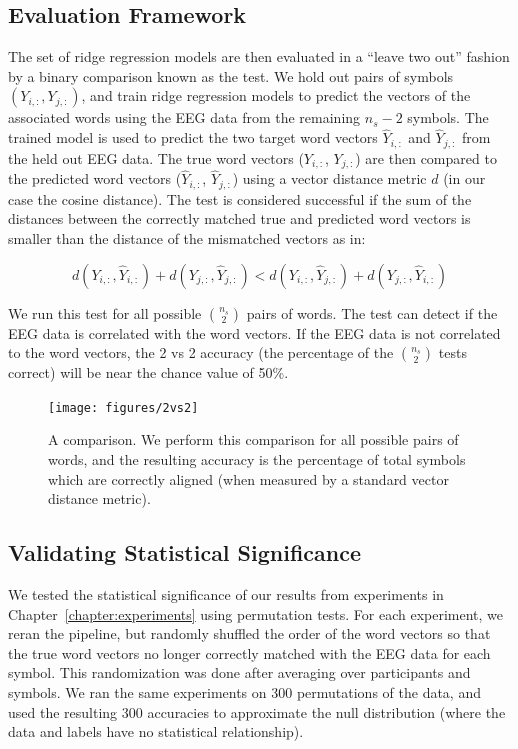 \subsection{Evaluation Framework}
The set of ridge regression models are then evaluated in a ``leave two out'' 
fashion by a binary comparison known as the \tvt test. We hold out pairs of 
symbols $(Y_{i,:}, Y_{j,:})$, and train ridge regression models to predict the 
vectors of the associated words using the EEG data from the remaining $n_s-2$ 
symbols.  The trained model is used to predict the two target word vectors 
$\hat{Y}_{i,:}$ and $\hat{Y}_{j,:}$ from the held out EEG data. The true word 
vectors ($Y_{i,:}$, $Y_{j,:}$) are then compared to the predicted word vectors 
($\hat{Y}_{i,:}$, $\hat{Y}_{j,:}$) using a vector distance metric $d$ (in our 
case the cosine distance). The \tvt test is considered successful if the sum of 
the distances between the correctly matched true and predicted word vectors is 
smaller than the distance of the mismatched vectors as in: 
  
\begin{equation}
  d(Y_{i,:}, \hat{Y}_{i,:}) + d(Y_{j,:}, \hat{Y}_{j,:}) < 
  d(Y_{i,:}, \hat{Y}_{j,:}) + d(Y_{j,:}, \hat{Y}_{i,:})
  \label{eq:2vs2}
\end{equation}

\noindent We run this test for all possible ${\binom{n_s}{2}}$ pairs of words.  
The \tvt test can detect if the EEG data is correlated with the word vectors.  
If the EEG data is not correlated to the word vectors, the 2 vs 2 accuracy (the 
percentage of the ${\binom{n_s}{2}}$ \tvt tests correct) will be  near the 
chance value of 50\%.

\begin{figure}[t]
  \centering
  \texttt{[image: figures/2vs2]}
  \caption[The \tvt Comparison]{
    A \tvt comparison. We perform this comparison for all possible pairs of 
    words, and the resulting \tvt accuracy is the percentage of total symbols 
    which are correctly aligned (when measured by a standard vector distance 
    metric).
  }
  \label{fig:2vs2}
\end{figure}

\subsection{Validating Statistical Significance}
We tested the statistical significance of our results from experiments in 
Chapter~\ref{chapter:experiments} using permutation tests. For each experiment, 
we reran the pipeline, but randomly shuffled the order of the word vectors so 
that the true word vectors no longer correctly matched with the EEG data for 
each symbol. This randomization was done after averaging over participants and 
symbols. We ran the same experiments on 300 permutations of the data, and used 
the resulting 300 \tvt accuracies to approximate the null distribution (where 
the data and labels have no statistical relationship). 
  
